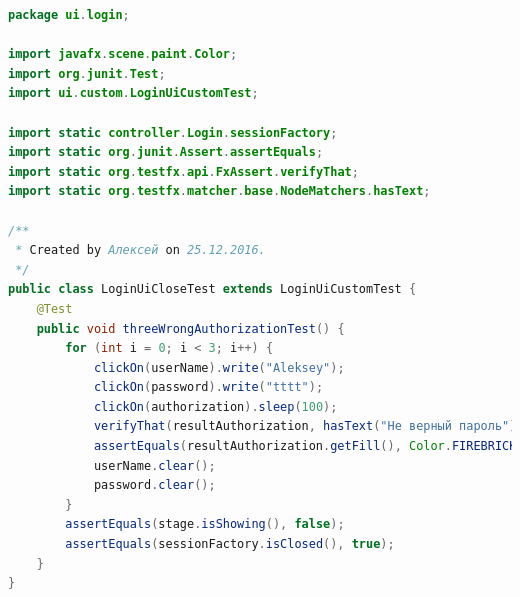 \documentclass[a4paper,12pt]{article}
\begin{document}
\begin{lstlisting}[language=java, caption=код модуля LoginUiCloseTest.java]
package ui.login;

import javafx.scene.paint.Color;
import org.junit.Test;
import ui.custom.LoginUiCustomTest;

import static controller.Login.sessionFactory;
import static org.junit.Assert.assertEquals;
import static org.testfx.api.FxAssert.verifyThat;
import static org.testfx.matcher.base.NodeMatchers.hasText;

/**
 * Created by Алексей on 25.12.2016.
 */
public class LoginUiCloseTest extends LoginUiCustomTest {
    @Test
    public void threeWrongAuthorizationTest() {
        for (int i = 0; i < 3; i++) {
            clickOn(userName).write("Aleksey");
            clickOn(password).write("tttt");
            clickOn(authorization).sleep(100);
            verifyThat(resultAuthorization, hasText("Не верный пароль"));
            assertEquals(resultAuthorization.getFill(), Color.FIREBRICK);
            userName.clear();
            password.clear();
        }
        assertEquals(stage.isShowing(), false);
        assertEquals(sessionFactory.isClosed(), true);
    }
}
\end{lstlisting}
\end{document}
